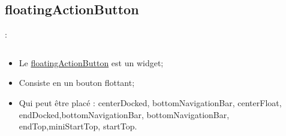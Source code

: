 \documentclass[10pt]{beamer}
\begin{document}
\subsection{floatingActionButton}
\begin{frame}[fragile,t]{\secname : \subsecname}
    \begin{columns}
        \begin{column}{0.6\textwidth}
            \begin{itemize}
                \item Le \href{https://api.flutter.dev/flutter/material/FloatingActionButton-class.html}{floatingActionButton} est un widget;
                \item Consiste en un bouton flottant;
                \item Qui peut être placé : centerDocked, bottomNavigationBar, centerFloat, endDocked,bottomNavigationBar, bottomNavigationBar, endTop,miniStartTop, startTop.
            \end{itemize}


\end{column}
\end{columns}
\end{frame}
\end{document}
